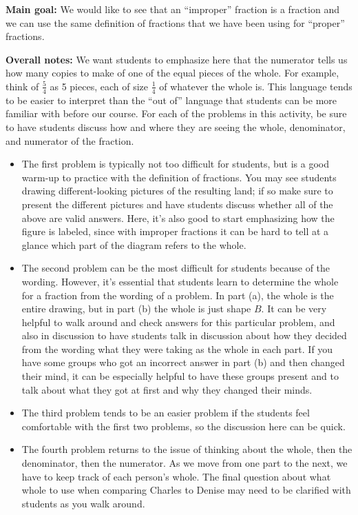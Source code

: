\documentclass[nooutcomes, noauthor, handout]{ximera}
\begin{document}
\newpage

\begin{instructorNotes}

{\bf Main goal:} We would like to see that an ``improper'' fraction is a fraction and we can use the same definition of fractions that we have been using for ``proper'' fractions.

{\bf Overall notes:} We want students to emphasize here that the numerator tells us how many copies to make of one of the equal pieces of the whole. For example, think of $\frac{5}{4}$ as 5 pieces, each of size $\frac{1}{4}$ of whatever the whole is. This language tends to be easier to interpret than the ``out of'' language that students can be more familiar with before our course. For each of the problems in this activity, be sure to have students discuss how and where they are seeing the whole, denominator, and numerator of the fraction.
\begin{itemize}
	\item The first problem is typically not too difficult for students, but is a good warm-up to practice with the definition of fractions. You may see students drawing different-looking pictures of the resulting land; if so make sure to present the different pictures and have students discuss whether all of the above are valid answers. Here, it's also good to start emphasizing how the figure is labeled, since with improper fractions it can be hard to tell at a glance which part of the diagram refers to the whole.
	\item The second problem can be the most difficult for students because of the wording. However, it's essential that students learn to determine the whole for a fraction from the wording of a problem. In part (a), the whole is the entire drawing, but in part (b) the whole is just shape $B$. It can be very helpful to walk around and check answers for this particular problem, and also in discussion to have students talk in discussion about how they decided from the wording what they were taking as the whole in each part. If you have some groups who got an incorrect answer in part (b) and then changed their mind, it can be especially helpful to have these groups present and to talk about what they got at first and why they changed their minds.
	\item The third problem tends to be an easier problem if the students feel comfortable with the first two problems, so the discussion here can be quick.
	\item The fourth problem returns to the issue of thinking about the whole, then the denominator, then the numerator. As we move from one part to the next, we have to keep track of each person's whole. The final question about what whole to use when comparing  Charles  to Denise  may need to be clarified with students as you walk around.
\end{itemize}


\end{instructorNotes}
\end{document}
